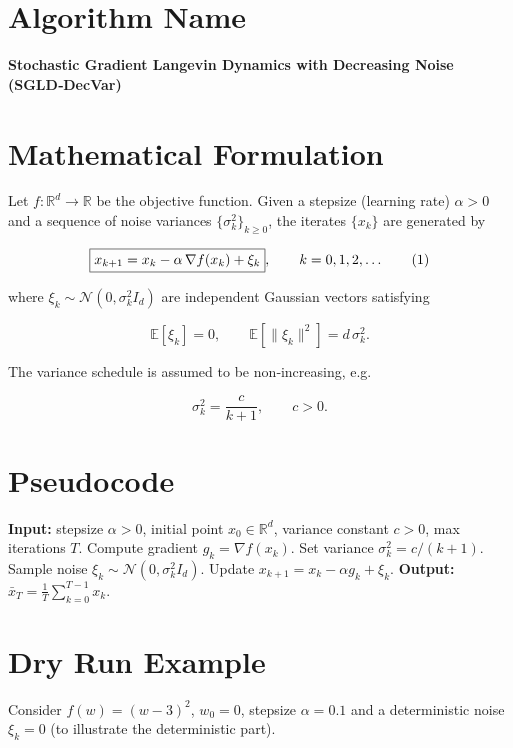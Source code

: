 \documentclass{article}
\newcommand{\E}{\mathbb{E}}
\newcommand{\R}{\mathbb{R}}
\begin{document}
\section*{Algorithm Name}
\textbf{Stochastic Gradient Langevin Dynamics with Decreasing Noise (SGLD‑DecVar)}

\section*{Mathematical Formulation}
Let $f:\R^{d}\rightarrow\R$ be the objective function.  
Given a stepsize (learning rate) $\alpha>0$ and a sequence of noise variances
$\{\sigma_{k}^{2}\}_{k\ge 0}$, the iterates $\{x_{k}\}$ are generated by  

\[
\boxed{%
x_{k+1}=x_{k}-\alpha \,\nabla f(x_{k})+\xi_{k}},\qquad k=0,1,2,\dots
\tag{1}
\]

where $\xi_{k}\sim\mathcal N(0,\sigma_{k}^{2}I_{d})$ are independent Gaussian
vectors satisfying  

\[
\E[\xi_{k}]=0,\qquad \E[\|\xi_{k}\|^{2}]=d\,\sigma_{k}^{2}.
\tag{2}
\]

The variance schedule is assumed to be non‑increasing, e.g.  

\[
\sigma_{k}^{2}= \frac{c}{k+1},\qquad c>0.
\tag{3}
\]

\section*{Pseudocode}
\begin{algorithm}[H]
\caption{SGLD‑DecVar}
\begin{algorithmic}[1]
\State \textbf{Input:} stepsize $\alpha>0$, initial point $x_{0}\in\R^{d}$,
          variance constant $c>0$, max iterations $T$.
    \State Compute gradient $g_{k}= \nabla f(x_{k})$.
    \State Set variance $\sigma_{k}^{2}=c/(k+1)$.
    \State Sample noise $\xi_{k}\sim\mathcal N(0,\sigma_{k}^{2}I_{d})$.
    \State Update $x_{k+1}=x_{k}-\alpha g_{k}+\xi_{k}$.
\EndFor
\State \textbf{Output:} $\displaystyle \bar x_{T}= \frac1T\sum_{k=0}^{T-1}x_{k}$.
\end{algorithmic}
\end{algorithm}

\section*{Dry Run Example}
Consider $f(w)=(w-3)^{2}$, $w_{0}=0$, stepsize $\alpha=0.1$ and a deterministic
noise $\xi_{k}=0$ (to illustrate the deterministic part).  
\end{document}
